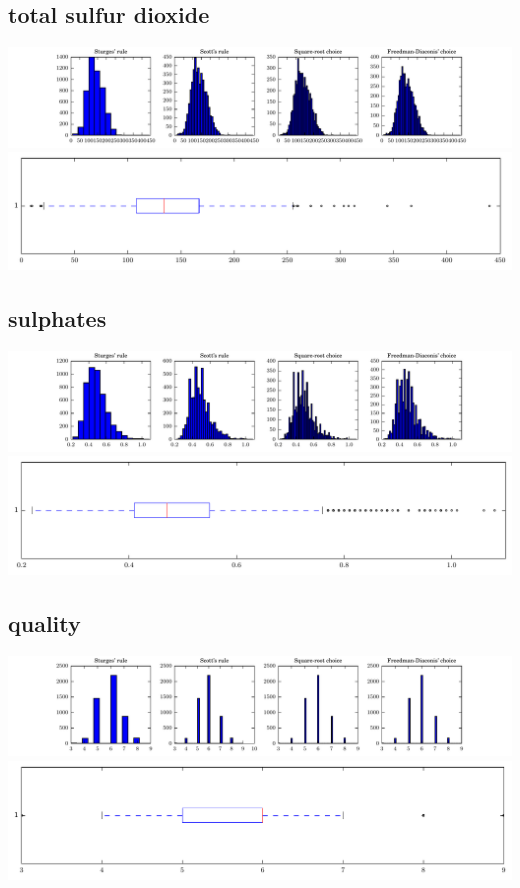 \documentclass{report}
\begin{document}
\subsection{total sulfur dioxide}
\includegraphics{histograms/total_sulfur_dioxide.pdf}
\includegraphics{boxplots/total_sulfur_dioxide.pdf}
\subsection{sulphates}
\includegraphics{histograms/sulphates.pdf}
\includegraphics{boxplots/sulphates.pdf}
\subsection{quality}
\includegraphics{histograms/quality.pdf}
\includegraphics{boxplots/quality.pdf}
\end{document}
